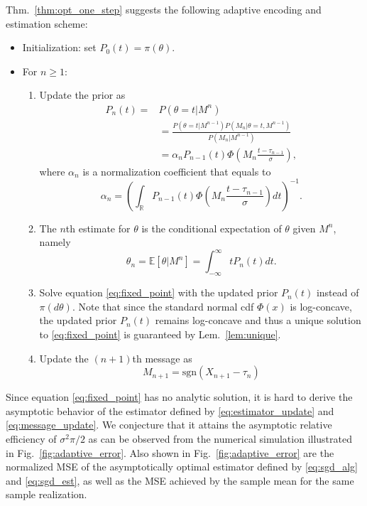 \documentclass[letterpaper, conference,9pt]{IEEEtran}      %
\newcommand{\sgn}{\mathrm{sgn} }
\begin{document}
Thm.~\ref{thm:opt_one_step} suggests the following adaptive encoding and estimation scheme: 
\begin{itemize}
\item Initialization: set $P_0(t) = \pi(\theta)$.
\item For $n\geq 1$:
\begin{enumerate}
\item Update the prior as
\begin{align}
P_n(t) = & P(\theta=t |M^n) \\
& = \frac{ P\left( \theta=t | M^{n-1} \right) P(M_n | \theta = t , M^{n-1})  } { P(M_n | M^{n-1} )} \nonumber \\ 
& = \alpha_n  P_{n-1}(t) \Phi\left(M_n \frac{ t - \tau_{n-1} }{\sigma} \right), \label{eq:density_update}
\end{align}
where $\alpha_n$ is a normalization coefficient that equals to
\[
\alpha_n = \left(\int_{\mathbb R} P_{n-1}(t) \Phi\left(M_n \frac{t- \tau_{n-1} }{\sigma} \right)  dt \right)^{-1}. 
\]
\item The $n$th estimate for $\theta$ is the conditional expectation of $\theta$ given $M^n$, namely
\begin{equation}
\theta_n = \mathbb E \left[ \theta| M^n\right] = \int_{-\infty}^\infty t P_n(t) dt. \label{eq:estimator_update}
\end{equation}
\item Solve equation \eqref{eq:fixed_point} with the updated prior $P_n(t)$ instead of $\pi(d\theta)$. Note that since the standard normal cdf $\Phi(x)$ is log-concave, the updated prior $P_n(t)$ remains log-concave and thus a unique solution to \eqref{eq:fixed_point} is guaranteed by Lem.~\ref{lem:unique}. 
\item Update the $(n+1)$th message as
\begin{equation}\label{eq:message_update}
M_{n+1} = \sgn(X_{n+1}-\tau_n)
\end{equation}
\end{enumerate}
\end{itemize}
Since equation \eqref{eq:fixed_point} has no analytic solution, it is hard to derive the asymptotic behavior of the estimator defined by \eqref{eq:estimator_update} and \eqref{eq:message_update}. We conjecture that it attains the asymptotic relative efficiency of $\sigma^2\pi/2$ as can be observed from the numerical simulation illustrated in Fig.~\ref{fig:adaptive_error}. Also shown in Fig.~\ref{fig:adaptive_error} are the normalized MSE of the asymptotically optimal estimator defined by \eqref{eq:sgd_alg} and \eqref{eq:sgd_est}, as well as the MSE achieved by the sample mean for the same sample realization.
\end{document}
